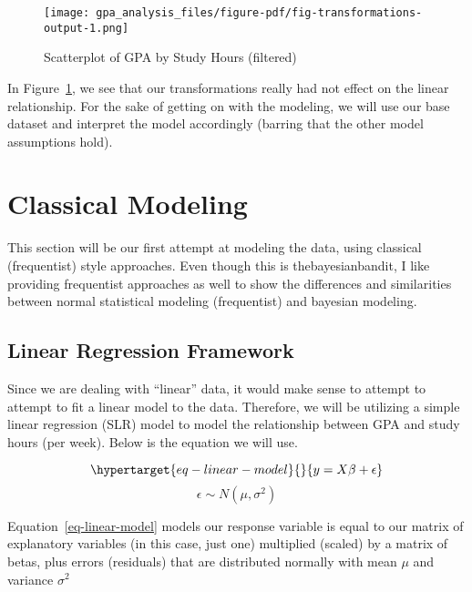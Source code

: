 \documentclass[
  letterpaper,
  DIV=11,
  numbers=noendperiod]{scrreprt}
\begin{document}
\begin{figure}[H]

{\centering \texttt{[image: gpa\_analysis\_files/figure-pdf/fig-transformations-output-1.png]}

}

\caption{\label{fig-transformations}Scatterplot of GPA by Study Hours
(filtered)}

\end{figure}

In Figure~\ref{fig-transformations}, we see that our transformations
really had not effect on the linear relationship. For the sake of
getting on with the modeling, we will use our base dataset and interpret
the model accordingly (barring that the other model assumptions hold).

\hypertarget{classical-modeling}{%
\section{Classical Modeling}\label{classical-modeling}}

This section will be our first attempt at modeling the data, using
classical (frequentist) style approaches. Even though this is
thebayesianbandit, I like providing frequentist approaches as well to
show the differences and similarities between normal statistical
modeling (frequentist) and bayesian modeling.

\hypertarget{linear-regression-framework}{%
\subsection{Linear Regression
Framework}\label{linear-regression-framework}}

Since we are dealing with ``linear'' data, it would make sense to
attempt to attempt to fit a linear model to the data. Therefore, we will
be utilizing a simple linear regression (SLR) model to model the
relationship between GPA and study hours (per week). Below is the
equation we will use.

\begin{equation}\protect\hypertarget{eq-linear-model}{}{
y = X\beta + \epsilon 
}\label{eq-linear-model}\end{equation}
\[\epsilon \sim N(\mu, \sigma^2)\]

Equation~\ref{eq-linear-model} models our response variable is equal to
our matrix of explanatory variables (in this case, just one) multiplied
(scaled) by a matrix of betas, plus errors (residuals) that are
distributed normally with mean \(\mu\) and variance \(\sigma^2\)
\end{document}
